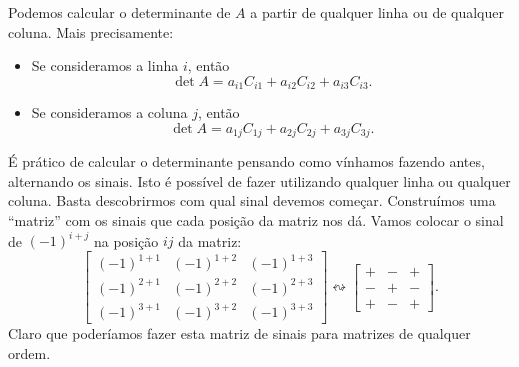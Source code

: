 \begin{teo}
Podemos calcular o determinante de $A$ a partir de qualquer linha ou de qualquer coluna. Mais precisamente:
\begin{itemize}
\item Se consideramos a linha $i$, então
\begin{equation}
\det A = a_{i1} C_{i1} + a_{i2} C_{i2} + a_{i3} C_{i3}.
\end{equation}
\item Se consideramos a coluna $j$, então
\begin{equation}
\det A = a_{1j} C_{1j} + a_{2j} C_{2j} + a_{3j} C_{3j}.
\end{equation}
\end{itemize}
\end{teo}

É prático de calcular o determinante pensando como vínhamos fazendo antes, alternando os sinais. Isto é possível de fazer utilizando qualquer linha ou qualquer coluna. Basta descobrirmos com qual sinal devemos começar. Construímos uma ``matriz'' com os sinais que cada posição da matriz nos dá. Vamos colocar o sinal de $(-1)^{i+j}$ na posição $ij$ da matriz:
\begin{equation}
\begin{bmatrix}
(-1)^{1+1} & (-1)^{1+2} & (-1)^{1+3}\\
(-1)^{2+1} & (-1)^{2+2} & (-1)^{2+3}\\
(-1)^{3+1} & (-1)^{3+2} & (-1)^{3+3}
\end{bmatrix} \leftrightsquigarrow
\begin{bmatrix}
+ & - & +  \\
- & + & -  \\
+ & - & +
\end{bmatrix}.
\end{equation} Claro que poderíamos fazer esta matriz de sinais para matrizes de qualquer ordem.


